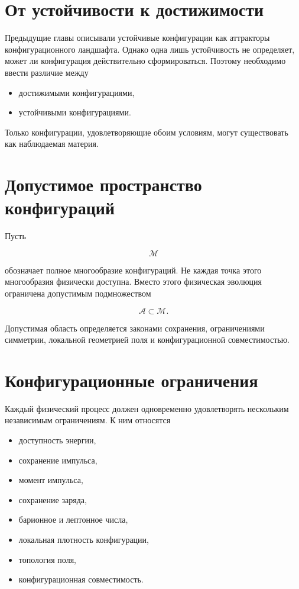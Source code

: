 \section{От устойчивости к достижимости}

Предыдущие главы описывали устойчивые конфигурации как аттракторы конфигурационного ландшафта. Однако одна лишь устойчивость не определяет, может ли конфигурация действительно сформироваться. Поэтому необходимо ввести различие между

\begin{itemize}
\item достижимыми конфигурациями,
\item устойчивыми конфигурациями.
\end{itemize}

Только конфигурации, удовлетворяющие обоим условиям, могут существовать как наблюдаемая материя.

\section{Допустимое пространство конфигураций}

Пусть

\[ \mathcal M \]

обозначает полное многообразие конфигураций. Не каждая точка этого многообразия физически доступна. Вместо этого физическая эволюция ограничена допустимым подмножеством

\[ \boxed{ \mathcal A \subset \mathcal M. } \]

Допустимая область определяется законами сохранения, ограничениями симметрии, локальной геометрией поля и конфигурационной совместимостью.

\section{Конфигурационные ограничения}

Каждый физический процесс должен одновременно удовлетворять нескольким независимым ограничениям. К ним относятся

\begin{itemize}
\item доступность энергии,
\item сохранение импульса,
\item момент импульса,
\item сохранение заряда,
\item барионное и лептонное числа,
\item локальная плотность конфигурации,
\item топология поля,
\item конфигурационная совместимость.
\end{itemize}


